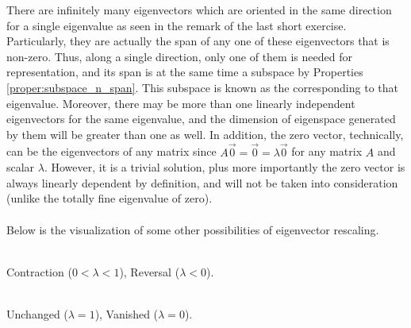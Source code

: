 There are infinitely many eigenvectors which are oriented in the same direction for a single eigenvalue as seen in the remark of the last short exercise. Particularly, they are actually the span of any one of these eigenvectors that is non-zero. Thus, along a single direction, only one of them is needed for representation, and its span is at the same time a subspace by Properties \ref{proper:subspace_n_span}. This subspace is known as the  corresponding to that eigenvalue. Moreover, there may be more than one linearly independent eigenvectors for the same eigenvalue, and the dimension of eigenspace generated by them will be greater than one as well. In addition, the zero vector, technically, can be the eigenvectors of any matrix since $A\vec{0} = \vec{0} = \lambda\vec{0}$ for any matrix $A$ and scalar $\lambda$. However, it is a trivial solution, plus more importantly the zero vector is always linearly dependent by definition, and will not be taken into consideration (unlike the totally fine eigenvalue of zero).\\
\\
Below is the visualization of some other possibilities of eigenvector rescaling.
\begin{center}
\\
Contraction ($0 < \lambda < 1$), Reversal ($\lambda < 0$). \\
\\
Unchanged ($\lambda = 1$), Vanished ($\lambda = 0$). 
\end{center}

